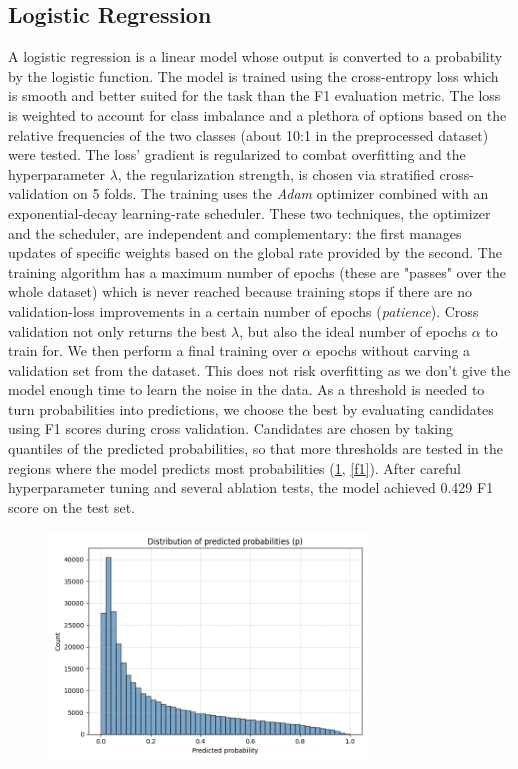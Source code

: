 \documentclass[10pt,conference,compsocconf]{IEEEtran}
\begin{document}
\subsection{Logistic Regression}
A logistic regression is a linear model whose output is converted to a probability by the logistic function. The model is trained using the cross-entropy loss which is smooth and better suited for the task than the F1 evaluation metric. The loss is weighted to account for class imbalance and a plethora of options based on the relative frequencies of the two classes (about 10:1 in the preprocessed dataset) were tested. The loss' gradient is regularized to combat overfitting and the hyperparameter $\lambda$, the regularization strength, is chosen via stratified cross-validation on 5 folds. The training uses the \textit{Adam} \cite{adam} optimizer combined with an exponential-decay learning-rate scheduler. These two techniques, the optimizer and the scheduler, are independent and complementary: the first manages updates of specific weights based on the global rate provided by the second. The training algorithm has a maximum number of epochs (these are "passes" over the whole dataset) which is never reached because training stops if there are no validation-loss improvements in a certain number of epochs (\textit{patience}). Cross validation not only returns the best $\lambda$, but also the ideal number of epochs $\alpha$ to train for. We then perform a final training over $\alpha$ epochs without carving a validation set from the dataset. This does not risk overfitting as we don't give the model enough time to learn the noise in the data. As a threshold is needed to turn probabilities into predictions, we choose the best by evaluating candidates using F1 scores during cross validation. Candidates are chosen by taking quantiles of the predicted probabilities, so that more thresholds are tested in the regions where the model predicts most probabilities (\ref{prob}, \ref{f1}). After careful hyperparameter tuning and several ablation tests, the model achieved 0.429 F1 score on the test set. 

\begin{figure}[t!]
    \centering
    \includegraphics[width=85mm]{probability_distribution.png}
    \label{prob}
\end{figure}
\end{document}
